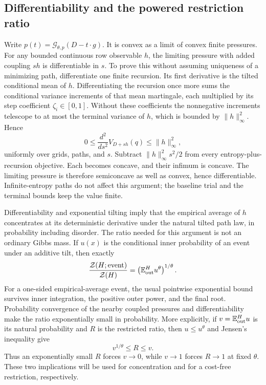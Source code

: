 \documentclass[11pt]{article}
\numberwithin{equation}{section}
\theoremstyle{definition}
\newcommand{\E}{\mathbb E}
\newcommand{\Gauss}{\mathcal G}
\newcommand{\calZ}{\mathcal Z}
\newcommand{\norm}[1]{\lVert #1\rVert}
\begin{document}
\subsection{Differentiability and the powered restriction ratio}
Write $p(t)=\Gauss_{\theta,p}(D-t\cdot g)$. It is convex as a limit of convex finite pressures. For any bounded continuous row observable $h$, the limiting pressure with added coupling $s h$ is differentiable in $s$. To prove this without assuming uniqueness of a minimizing path, differentiate one finite recursion. Its first derivative is the tilted conditional mean of $h$. Differentiating the recursion once more sums the conditional variance increments of that mean martingale, each multiplied by its step coefficient $\zeta_i\in[0,1]$. Without these coefficients the nonnegative increments telescope to at most the terminal variance of $h$, which is bounded by $\norm h_\infty^2$. Hence
\begin{equation}\label{eq:curvature}
0\le\frac{d^2}{ds^2}V_{D+s h}(q)\le\norm h_\infty^2,
\end{equation}
uniformly over grids, paths, and $s$. Subtract $\norm h_\infty^2s^2/2$ from every entropy-plus-recursion objective. Each becomes concave, and their infimum is concave. The limiting pressure is therefore semiconcave as well as convex, hence differentiable. Infinite-entropy paths do not affect this argument; the baseline trial and the terminal bounds keep the value finite.

Differentiability and exponential tilting imply that the empirical average of $h$ concentrates at its deterministic derivative under the natural tilted path law, in probability including disorder. The ratio needed for this argument is not an ordinary Gibbs mass. If $u(x)$ is the conditional inner probability of an event under an additive tilt, then exactly
\begin{equation}\label{eq:poweredratio}
\frac{\calZ(H;\text{event})}{\calZ(H)}
=\left(\E_{\rm out}^{H}u^\theta\right)^{1/\theta}.
\end{equation}
For a one-sided empirical-average event, the usual pointwise exponential bound survives inner integration, the positive outer power, and the final root. Probability convergence of the nearby coupled pressures and differentiability make the ratio exponentially small in probability. More explicitly, if $v=\E_{\rm out}^{H}u$ is its natural probability and $R$ is the restricted ratio, then $u\le u^\theta$ and Jensen's inequality give
\[
v^{1/\theta}\le R\le v.
\]
Thus an exponentially small $R$ forces $v\to0$, while $v\to1$ forces $R\to1$ at fixed $\theta$. These two implications will be used for concentration and for a cost-free restriction, respectively.
\end{document}
